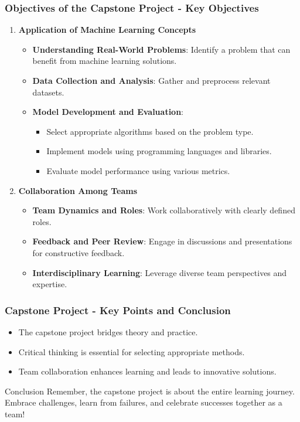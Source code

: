 \documentclass{beamer}
\begin{document}
\begin{frame}[fragile]
    \frametitle{Objectives of the Capstone Project - Key Objectives}
    \begin{enumerate}
        \item \textbf{Application of Machine Learning Concepts}
            \begin{itemize}
                \item \textbf{Understanding Real-World Problems}: Identify a problem that can benefit from machine learning solutions.
                \item \textbf{Data Collection and Analysis}: Gather and preprocess relevant datasets.
                \item \textbf{Model Development and Evaluation}:
                    \begin{itemize}
                        \item Select appropriate algorithms based on the problem type.
                        \item Implement models using programming languages and libraries.
                        \item Evaluate model performance using various metrics.
                    \end{itemize}
            \end{itemize}
        \item \textbf{Collaboration Among Teams}
            \begin{itemize}
                \item \textbf{Team Dynamics and Roles}: Work collaboratively with clearly defined roles.
                \item \textbf{Feedback and Peer Review}: Engage in discussions and presentations for constructive feedback.
                \item \textbf{Interdisciplinary Learning}: Leverage diverse team perspectives and expertise.
            \end{itemize}
    \end{enumerate}
\end{frame}

\begin{frame}[fragile]
    \frametitle{Capstone Project - Key Points and Conclusion}
    \begin{itemize}
        \item The capstone project bridges theory and practice.
        \item Critical thinking is essential for selecting appropriate methods.
        \item Team collaboration enhances learning and leads to innovative solutions.
    \end{itemize}
    \begin{block}{Conclusion}
        Remember, the capstone project is about the entire learning journey. Embrace challenges, learn from failures, and celebrate successes together as a team!
    \end{block}
\end{frame}
\end{document}
